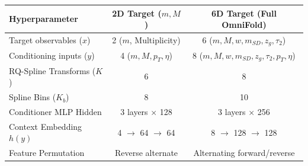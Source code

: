 \begin{table}[htbp]
\centering
\footnotesize
\begin{tabular}{lcc}
\toprule
\textbf{Hyperparameter} & \textbf{2D Target ($m, M$)} & \textbf{6D Target (Full OmniFold)} \\
\midrule
Target observables ($x$) & 2 ($m$, Multiplicity) & 6 ($m, M, w, m_{SD}, z_g, \tau_2$) \\
Conditioning inputs ($y$) & 4 ($m, M, p_T, \eta$) & 8 ($m, M, w, m_{SD}, z_g, \tau_2, p_T, \eta$) \\
RQ-Spline Transforms ($K$) & 6 & 8 \\
Spline Bins ($K_b$) & 8 & 10 \\
Conditioner MLP Hidden & 3 layers $\times$ 128 & 3 layers $\times$ 256 \\
Context Embedding $h(y)$ & 4 $\to$ 64 $\to$ 64 & 8 $\to$ 128 $\to$ 128 \\
Feature Permutation & Reverse alternate & Alternating forward/reverse \\
\bottomrule
\end{tabular}
\end{table}
